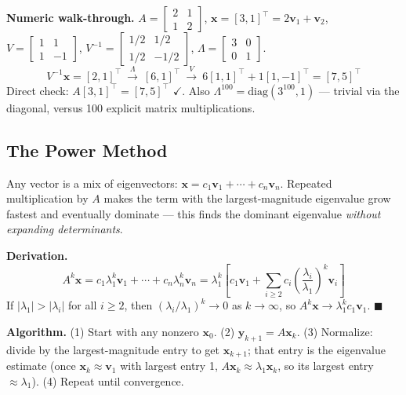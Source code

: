 \begin{examplebox}
\textbf{Numeric walk-through.} $A=\begin{bmatrix}2&1\\1&2\end{bmatrix}$, $\mathbf x=[3,1]^\top=2\mathbf v_1+\mathbf v_2$, $V=\begin{bmatrix}1&1\\1&-1\end{bmatrix}$, $V^{-1}=\begin{bmatrix}1/2&1/2\\1/2&-1/2\end{bmatrix}$, $\Lambda=\begin{bmatrix}3&0\\0&1\end{bmatrix}$.
\[
V^{-1}\mathbf x = [2,1]^\top \ \xrightarrow{\Lambda} \ [6,1]^\top \ \xrightarrow{V} \ 6[1,1]^\top+1[1,-1]^\top = [7,5]^\top
\]
Direct check: $A[3,1]^\top=[7,5]^\top$ $\checkmark$. Also $\Lambda^{100}=\mathrm{diag}(3^{100},1)$ — trivial via the diagonal, versus 100 explicit matrix multiplications.
\end{examplebox}

\subsection{The Power Method}

\begin{defbox}
Any vector is a mix of eigenvectors: $\mathbf x=c_1\mathbf v_1+\cdots+c_n\mathbf v_n$. Repeated multiplication by $A$ makes the term with the largest-magnitude eigenvalue grow fastest and eventually dominate — this finds the dominant eigenvalue \emph{without expanding determinants}.
\end{defbox}

\begin{examplebox}
\textbf{Derivation.}
\[
A^k\mathbf x = c_1\lambda_1^k\mathbf v_1+\cdots+c_n\lambda_n^k\mathbf v_n = \lambda_1^k\left[c_1\mathbf v_1+\sum_{i\ge2}c_i\left(\frac{\lambda_i}{\lambda_1}\right)^k\mathbf v_i\right]
\]
If $|\lambda_1|>|\lambda_i|$ for all $i\ge2$, then $(\lambda_i/\lambda_1)^k\to0$ as $k\to\infty$, so $A^k\mathbf x \to \lambda_1^kc_1\mathbf v_1$. $\blacksquare$
\end{examplebox}

\textbf{Algorithm.} (1) Start with any nonzero $\mathbf x_0$. (2) $\mathbf y_{k+1}=A\mathbf x_k$. (3) Normalize: divide by the largest-magnitude entry to get $\mathbf x_{k+1}$; that entry is the eigenvalue estimate (once $\mathbf x_k\approx\mathbf v_1$ with largest entry 1, $A\mathbf x_k\approx\lambda_1\mathbf x_k$, so its largest entry $\approx\lambda_1$). (4) Repeat until convergence.

